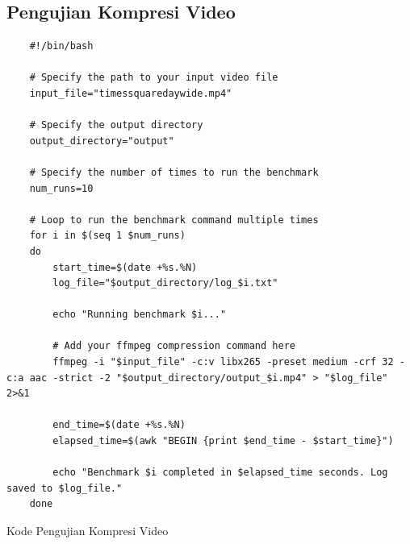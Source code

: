 \subsection{Pengujian Kompresi Video}
\begin{listing}[H]
    \begin{verbatim}
    #!/bin/bash
    
    # Specify the path to your input video file
    input_file="timessquaredaywide.mp4"

    # Specify the output directory
    output_directory="output"

    # Specify the number of times to run the benchmark
    num_runs=10

    # Loop to run the benchmark command multiple times
    for i in $(seq 1 $num_runs)
    do
        start_time=$(date +%s.%N)
        log_file="$output_directory/log_$i.txt"
        
        echo "Running benchmark $i..."
        
        # Add your ffmpeg compression command here
        ffmpeg -i "$input_file" -c:v libx265 -preset medium -crf 32 -c:a aac -strict -2 "$output_directory/output_$i.mp4" > "$log_file" 2>&1
        
        end_time=$(date +%s.%N)
        elapsed_time=$(awk "BEGIN {print $end_time - $start_time}")
        
        echo "Benchmark $i completed in $elapsed_time seconds. Log saved to $log_file."
    done
    \end{verbatim}
    \caption{Kode Pengujian Kompresi Video}
    \label{code:kode_pengujian_kompresi_video}
\end{listing}

